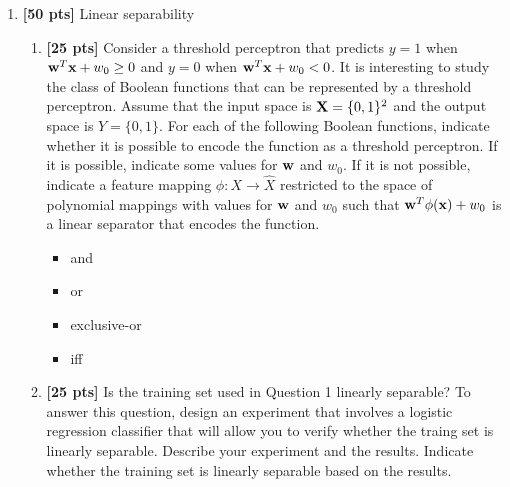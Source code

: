 \documentclass{article}
\begin{document}
\begin{enumerate}
\item {\bf [50 pts]} Linear separability
  \begin{enumerate}
  \item {\bf [25 pts]} Consider a threshold perceptron that predicts $y=1$ when
    ${\bf{w}}^T{\bf{x}}+w_0\ge0$ and $y=0$ when ${\bf{w}}^T{\bf{x}}+w_0<0$.  It is interesting to
    study the class of Boolean functions that can be represented by a
    threshold perceptron.  Assume that the input space is
    ${\bf{X}}=\{0,1\}^2$ and the output space is $Y=\{0,1\}$.  For each of
    the following Boolean functions, indicate whether it is possible
    to encode the function as a threshold perceptron.  If it is
    possible, indicate some values for ${\bf{w}}$ and $w_0$.  If it is not
    possible, indicate a feature mapping $\phi:X\rightarrow\hat{X}$ restricted to the space of polynomial mappings
    with values for ${\bf{w}}$ and $w_0$ such that ${\bf{w}}^T\phi({\bf{x}})+w_0$ is a linear
    separator that encodes the function.
    \begin{itemize}
      \item and
      \item or
      \item exclusive-or
      \item iff
    \end{itemize}
  \item {\bf [25 pts]} Is the training set used in Question 1 linearly separable?  To answer this question, design an experiment that involves a logistic regression classifier that will allow you to verify whether the traing set is linearly separable.  Describe your experiment and the results.  Indicate whether the training set is linearly separable based on the results.
  \end{enumerate}

\end{enumerate}
\end{document}
